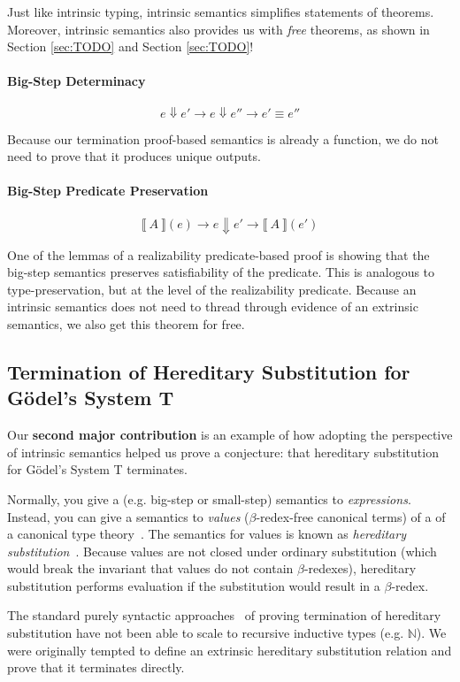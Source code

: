 \documentclass[preprint,nonatbib]{sigplanconf}
\numberwithin{mysubdfn}{mydfn}
\newcommand{\refsec}[1]{Section \ref{sec:#1}}
\def\bigstep{\Downarrow}
\def\marr{\rightarrow}
\def\nat{\mathbb{N}}
\newcommand{\el}[1]{\llbracket ~ #1 ~ \rrbracket}
\begin{document}
Just like intrinsic typing, intrinsic semantics simplifies statements
of theorems. Moreover, intrinsic semantics also provides us with
{\it free} theorems, as shown in \refsec{TODO} and \refsec{TODO}!

\paragraph{Big-Step Determinacy}

$$
e \bigstep e' \marr e \bigstep e'' \marr e' \equiv e''
$$

Because our termination proof-based semantics is already a function,
we do not need to prove that it produces unique outputs.

\paragraph{Big-Step Predicate Preservation}

$$
\el{A}(e) \marr e \bigstep e' \marr \el{A}(e')
$$

One of the lemmas of a realizability predicate-based proof is showing that
the big-step semantics preserves satisfiability
of the predicate. This is analogous to type-preservation, but at the
level of the realizability predicate. Because an intrinsic semantics
does not need to thread through evidence of an extrinsic semantics, we
also get this theorem for free.

\subsection{Termination of Hereditary Substitution for G{\"o}del's System T}

Our {\bf second major contribution} is an example of how adopting the
perspective of intrinsic semantics helped us prove a conjecture:
that hereditary substitution for G{\"o}del's System T terminates.

Normally, you give a (e.g. big-step or small-step) semantics to
{\it expressions}. Instead, you can give a semantics to {\it values}
($\beta$-redex-free canonical terms) of a 
of a canonical type theory~\cite{TODO}. The semantics for values is
known as {\it hereditary substitution}~\cite{TODO}. Because values are
not closed under ordinary substitution (which would break the invariant that values
do not contain $\beta$-redexes), hereditary substitution
performs evaluation if the substitution would
result in a $\beta$-redex.

The standard purely syntactic approaches~\cite{TODO} of proving termination of
hereditary substitution have not been able to scale to recursive inductive types
(e.g. $\nat$). We were originally tempted to define an extrinsic
hereditary substitution relation and prove that it terminates directly.
\end{document}
